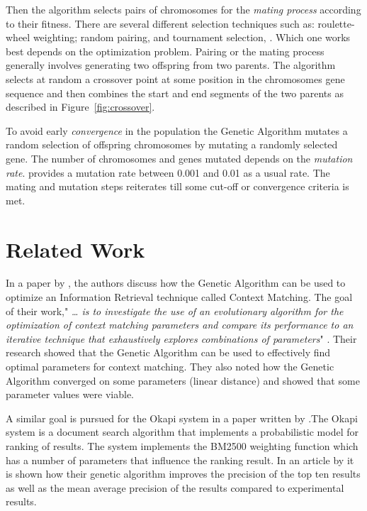 Then the algorithm selects pairs of chromosomes for the \textit{mating process} according to their fitness. There are several different selection techniques such as: roulette-wheel weighting; random pairing, and tournament selection, \cite{Haupt2004a}. Which one works best depends on the optimization problem. Pairing or the mating process generally involves generating two offspring from two parents. The algorithm selects at random a crossover point at some position in the chromosomes gene sequence and then combines the start and end segments of the two parents as described in Figure~\ref{fig:crossover}.

To avoid early \textit{convergence} in the population the Genetic Algorithm mutates a random selection of offspring chromosomes by mutating a randomly selected gene. The number of chromosomes and genes mutated depends on the \textit{mutation rate}. \cite{Goldberg1989,Negnevitsky2002} provides a mutation rate between 0.001 and 0.01 as a usual rate. The mating and mutation steps reiterates till some cut-off or convergence criteria is met.

\section{Related Work}
\label{RelatedWork}
In  a paper by \citeauthor{Zakos2005}, the authors discuss how the Genetic Algorithm can be used to optimize an Information Retrieval technique called Context Matching. The goal of their work," \textit{{\dots} is to investigate the use of an evolutionary algorithm for the optimization of context matching parameters and compare its performance to an iterative technique that exhaustively explores combinations of parameters}" \cite[582]{Zakos2005}. Their research showed that the Genetic Algorithm can be used to effectively find optimal parameters for context matching. They also noted how the Genetic Algorithm converged on some parameters (linear distance) and showed that some parameter values were viable.

A similar goal is pursued for the Okapi system in a paper written by \cite{Chuan2003}.The Okapi system is a document search algorithm that implements a probabilistic model for ranking of results. The system implements the BM2500 weighting function which has a number of parameters that influence the ranking result. In an article by \cite{Chuan2003} it is shown how their genetic algorithm improves the precision of the top ten results as well as the mean average precision of the results compared to experimental results.

